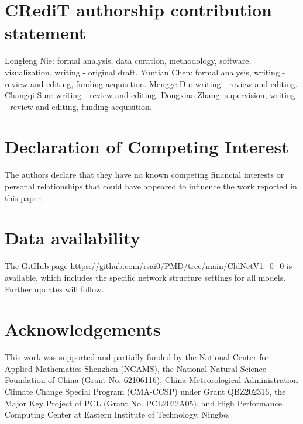 \documentclass[review]{elsarticle}
\begin{document}
\section*{CRediT authorship contribution statement}
Longfeng Nie: formal analysis, data curation, methodology, software, visualization, writing - original draft. Yuntian Chen: formal analysis, writing - review and editing, funding acquisition. Mengge Du: writing - review and editing. Changqi Sun: writing - review and editing. Dongxiao Zhang: supervision, writing - review and editing, funding acquisition.

\section*{Declaration of Competing Interest}
The authors declare that they have no known competing financial interests or personal relationships that could have appeared to influence the work reported in this paper.

\section*{Data availability}
The GitHub page \href{https://github.com/rsai0/PMD/tree/main/CldNetV1_0_0}{https://github.com/rsai0/PMD/tree/main/CldNetV1\_0\_0} is available, which includes the specific network structure settings for all models.
Further updates will follow.

\section*{Acknowledgements}
This work was supported and partially funded by the National Center for Applied Mathematics Shenzhen (NCAMS), the National Natural Science Foundation of China (Grant No. 62106116), China Meteorological Administration Climate Change Special Program (CMA-CCSP) under Grant QBZ202316, the Major Key Project of PCL (Grant No. PCL2022A05), and High Performance Computing Center at Eastern Institute of Technology, Ningbo.



\begin{appendices}

    \section{}
    \setcounter{table}{0}
    \renewcommand{\thetable}{A.\arabic{table}}   %
    \setcounter{figure}{0}
    \renewcommand{\thefigure}{A.\arabic{figure}}

    
    
    
    

\end{appendices}



% 
% 

\end{document}
